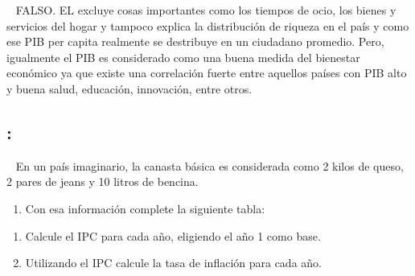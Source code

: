 \documentclass[
  letterpaper,
  DIV=11,
  numbers=noendperiod]{scrreport}
\providecommand{\tightlist}{%
  \setlength{\itemsep}{0pt}\setlength{\parskip}{0pt}}\usepackage{longtable,booktabs,array}
\begin{document}
~ FALSO. EL excluye cosas importantes como los tiempos de ocio, los
bienes y servicios del hogar y tampoco explica la distribución de
riqueza en el país y como ese PIB per capita realmente se destribuye en
un ciudadano promedio. Pero, igualmente el PIB es considerado como una
buena medida del bienestar económico ya que existe una correlación
fuerte entre aquellos países con PIB alto y buena salud, educación,
innovación, entre otros.

\hypertarget{section-20}{%
\subsection{:}\label{section-20}}

~ En un país imaginario, la canasta básica es considerada como 2 kilos
de queso, 2 pares de jeans y 10 litros de bencina.

\begin{enumerate}
\def\labelenumi{\alph{enumi})}
\tightlist
\item
  Con esa información complete la siguiente tabla:
\end{enumerate}

\begin{table}[H]
\end{table}

\begin{enumerate}
\def\labelenumi{\alph{enumi})}
\setcounter{enumi}{1}
\item
  Calcule el IPC para cada año, eligiendo el año 1 como base.
\item
  Utilizando el IPC calcule la tasa de inflación para cada año.
\end{enumerate}
\end{document}
